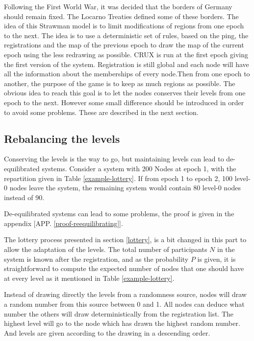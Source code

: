 \documentclass[a4paper,11pt,oneside]{report}
\begin{document}
Following the First World War, it was decided that the borders of Germany
should remain fixed. The Locarno Treaties defined some of these borders. The
idea of this Strawman model is to limit modifications of regions from one epoch
to the next. The idea is to use a deterministic set of rules, based on the
ping, the registrations and the map of the previous epoch to draw the map of
the current epoch using the less redrawing as possible. CRUX is run at the
first epoch giving the first version of the system. Registration is still
global and each node will have all the information about the memberships of
every node.Then from one epoch to another, the purpose of the game is to keep
as much regions as possible. The obvious idea to reach this goal is to let the
nodes conserves their levels from one epoch to the next.  However some small
difference should be introduced in order to avoid some problems.  These are
described in the next section.

\subsection{Rebalancing the levels} \label{rebalancing}
Conserving the levels is the way to go, but maintaining levels can lead to
de-equilibrated systems. Consider a system with 200 Nodes at epoch 1, with the
repartition given in Table \autoref{example-lottery}. If from epoch 1 to epoch 2,
100 level-0 nodes leave the system, the remaining system would contain 80
level-0 nodes instead of 90. 

De-equilibrated systems can lead to some problems, the proof is given in the
appendix [APP. \autoref{proof-reequilibrating}].

The lottery process presented in section \autoref{lottery}, is a bit changed in
this part to allow the adaptation of the levels. The total number of
participants $N$ in the system is known after the registration, and as the
probability $P$ is given, it is straightforward to compute the expected number
of nodes that one should have at every level as it mentioned in Table
\autoref{example-lottery}. 

Instead of drawing directly the levels from a randomness source, nodes will
draw a random number from this source between 0 and 1.  All nodes can deduce
what number the others will draw deterministically from the registration list.
The highest level will go to the node which has drawn the highest random
number.  And levels are given according to the drawing in a descending order.  
\end{document}
